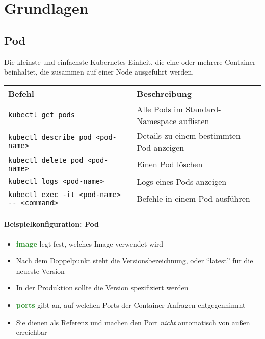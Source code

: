 \chapter{Grundlagen}

\section{Pod}
Die kleinste und einfachste Kubernetes-Einheit, die eine oder mehrere Container beinhaltet, die zusammen auf einer Node ausgeführt werden. \\

\noindent
\begin{tabular}{|p{}|p{}|}
\hline
\textbf{Befehl} & \textbf{Beschreibung} \\
\hline
\texttt{kubectl get pods} & Alle Pods im Standard-Namespace auflisten \\
\texttt{kubectl describe pod <pod-name>} & Details zu einem bestimmten Pod anzeigen \\
\texttt{kubectl delete pod <pod-name>} & Einen Pod löschen \\
\texttt{kubectl logs <pod-name>} & Logs eines Pods anzeigen \\
\texttt{kubectl exec -it <pod-name> {-}{-} <command>} & Befehle in einem Pod ausführen \\
\hline
\end{tabular}

\subsubsection{Beispielkonfiguration: Pod}


\begin{itemize}
    \item \textcolor{ForestGreen}{\textbf{image}} legt fest, welches Image verwendet wird
    \item Nach dem Doppelpunkt steht die Versionsbezeichnung, oder \enquote{latest} für die neueste Version
    \item In der Produktion sollte die Version spezifiziert werden
    \item \textcolor{ForestGreen}{\textbf{ports}} gibt an, auf welchen Ports der Container Anfragen entgegennimmt
    \item Sie dienen als Referenz und machen den Port \emph{nicht} automatisch von außen erreichbar
\end{itemize}

